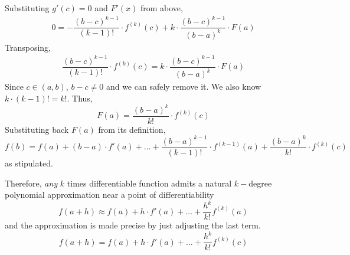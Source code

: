 \begin{SWP}{\thm}
$$$$
Substituting $g'(c) = 0$ and $F'(x)$ from above,
\begin{align*}
0 = -\dfrac{(b - c)^{k - 1}}{(k - 1)!}\cdot f^{(k)}(c) + k\cdot \dfrac{(b - c)^{k - 1}}{(b - a)^k}\cdot F(a)
\end{align*}
Transposing,
\begin{align*}
\dfrac{(b - c)^{k - 1}}{(k - 1)!}\cdot f^{(k)}(c) = k\cdot \dfrac{(b - c)^{k - 1}}{(b - a)^k}\cdot F(a)
\end{align*}
Since $c \in (a, b)$, $b - c \neq 0$ and we can safely remove it. We also know $k\cdot (k - 1)! = k!$. Thus,
$$
F(a) = \dfrac{(b - a)^k}{k!}\cdot f^{(k)}(c)
$$
Substituting back $F(a)$ from its definition,
$$
f(b) = f(a) + (b - a)\cdot f'(a) + \ldots + \dfrac{(b - a)^{k - 1}}{(k - 1)!}\cdot f^{(k - 1)}(a) + \dfrac{(b - a)^k}{k!}\cdot f^{(k)}(c)
$$
as stipulated.
\end{SWP}
Therefore, \emph{any} $k$ times differentiable function admits a natural $k-$degree polynomial approximation near a point of differentiability
$$
f(a + h) \approx f(a) + h\cdot f'(a) + \ldots + \dfrac{h^k}{k!}f^{(k)}(a)
$$
and the approximation is made precise by just adjusting the last term.
$$
f(a + h) = f(a) + h\cdot f'(a) + \ldots + \dfrac{h^k}{k!}f^{(k)}(c)
$$
